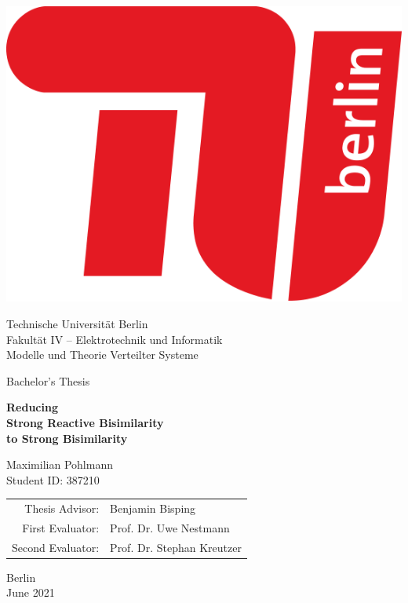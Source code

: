 \begin{titlepage}
\begin{center}
    \includegraphics[scale=.2]{TU}

    \vspace{3.5em}

    {\sc\large 
        {\LARGE Technische Universität Berlin}\\
        {Fakultät IV --  Elektrotechnik und Informatik}\\
        {Modelle und Theorie Verteilter Systeme}

        \vspace{4em}

        {Bachelor's Thesis}

        \vspace{1.5em}

        {\huge\upshape\bf Reducing\\[.1em] 
        Strong Reactive Bisimilarity\\[.25em]
        to Strong Bisimilarity}

        \vspace{3em}

        {\Large Maximilian Pohlmann}\\
        {Student ID: 387210}

        \vfill

        {\normalsize
            \begin{tabular}{r l}
                Thesis Advisor: & Benjamin Bisping \\
                First Evaluator: & Prof. Dr. Uwe Nestmann \\
                Second Evaluator: & Prof. Dr. Stephan Kreutzer
            \end{tabular}
        }

        \vspace{3em}

        Berlin\\
        June 2021
    }
\end{center}
\end{titlepage}
\restoregeometry